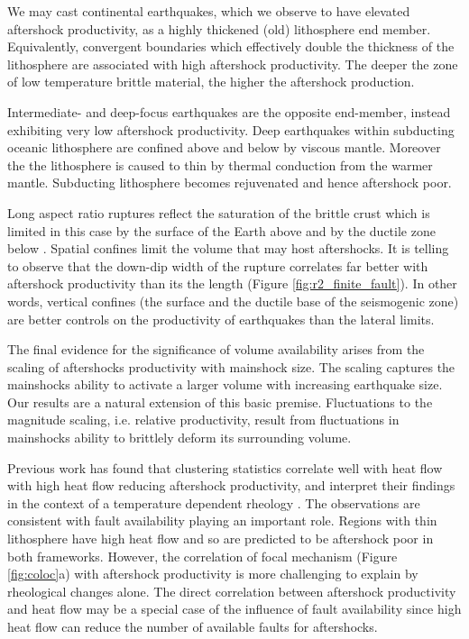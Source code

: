 \documentclass[draft, jgrga]{agujournal2018}
\begin{document}
We may cast continental earthquakes, which we observe to have elevated aftershock productivity, as a highly thickened (old) lithosphere end member. Equivalently, convergent boundaries which effectively double the thickness of the lithosphere are associated with high aftershock productivity. The deeper the zone of low temperature brittle material, the higher the aftershock production.

Intermediate- and deep-focus earthquakes are the opposite end-member, instead exhibiting very low aftershock productivity. Deep earthquakes within subducting oceanic lithosphere are confined above and below by viscous mantle. Moreover the the lithosphere is caused to thin by thermal conduction from the warmer mantle. Subducting lithosphere becomes rejuvenated and hence aftershock poor.

Long aspect ratio ruptures reflect the saturation of the brittle crust which is limited in this case by the surface of the Earth above and by the ductile zone below \citep{Scholz2019}. Spatial confines limit the volume that may host aftershocks. It is telling to observe that the down-dip width of the rupture correlates far better with aftershock productivity than its the length (Figure \ref{fig:r2_finite_fault}). In other words, vertical confines (the surface and the ductile base of the seismogenic zone) are better controls on the productivity of earthquakes than the lateral limits.

The final evidence for the significance of volume availability arises from the scaling of aftershocks productivity with mainshock size. The scaling captures the mainshocks ability to activate a larger volume with increasing earthquake size. Our results are a natural extension of this basic premise. Fluctuations to the magnitude scaling, i.e. relative productivity, result from fluctuations in mainshocks ability to brittlely deform its surrounding volume.

Previous work has found that clustering statistics correlate well with heat flow with high heat flow reducing aftershock productivity, and interpret their findings in the context of a temperature dependent rheology \citep{Ben-Zion2006AnalysisRheology, Zaliapin2016AClusters}. The observations are consistent with fault availability playing an important role. Regions with thin lithosphere have high heat flow and so are predicted to be aftershock poor in both frameworks. However, the correlation of focal mechanism (Figure \ref{fig:coloc}a) with aftershock productivity is more challenging to explain by rheological changes alone. The direct correlation between aftershock productivity and heat flow may be a special case of the influence of fault availability since high heat flow can reduce the number of available faults for aftershocks. %
\end{document}
